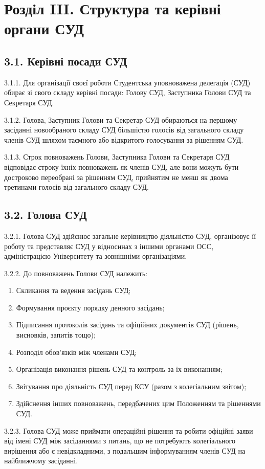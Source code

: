 \section*{Розділ III. Структура та керівні органи СУД}

\subsection*{3.1. Керівні посади СУД}
    3.1.1. Для організації своєї роботи Студентська уповноважена делегація (СУД) обирає зі свого складу керівні посади: Голову СУД, Заступника Голови СУД та Секретаря СУД.

    3.1.2. Голова, Заступник Голови та Секретар СУД обираються на першому засіданні новообраного складу СУД більшістю голосів від загального складу членів СУД шляхом таємного або відкритого голосування за рішенням СУД.

    3.1.3. Строк повноважень Голови, Заступника Голови та Секретаря СУД відповідає строку їхніх повноважень як членів СУД, але вони можуть бути достроково переобрані за рішенням СУД, прийнятим не менш як двома третинами голосів від загального складу СУД.

\subsection*{3.2. Голова СУД}
    3.2.1. Голова СУД здійснює загальне керівництво діяльністю СУД, організовує її роботу та представляє СУД у відносинах з іншими органами ОСС, адміністрацією Університету та зовнішніми організаціями.

    3.2.2. До повноважень Голови СУД належить:
        \begin{enumerate}[label=\alph*)]
            \item Скликання та ведення засідань СУД;
            \item Формування проєкту порядку денного засідань;
            \item Підписання протоколів засідань та офіційних документів СУД (рішень, висновків, запитів тощо);
            \item Розподіл обов'язків між членами СУД;
            \item Організація виконання рішень СУД та контроль за їх виконанням;
            \item Звітування про діяльність СУД перед КСУ (разом з колегіальним звітом);
            \item Здійснення інших повноважень, передбачених цим Положенням та рішеннями СУД.
        \end{enumerate}
    3.2.3. Голова СУД може приймати операційні рішення та робити офіційні заяви від імені СУД між засіданнями з питань, що не потребують колегіального вирішення або є невідкладними, з подальшим інформуванням членів СУД на найближчому засіданні.

